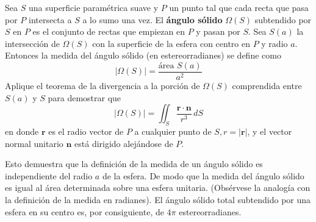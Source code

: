 \item Sea $S$ una superficie paramétrica suave y $P$ un punto tal que cada recta que pasa por $P$ intersecta a $S$ a lo sumo una vez. El \textbf{ángulo sólido} $\Omega(S)$ subtendido por $S$ en $P$ es el conjunto de rectas que empiezan en $P$ y pasan por $S$. Sea $S(a)$ la intersección de $\Omega(S)$ con la superficie de la esfera con centro en $P$ y radio $a$. Entonces la medida del ángulo sólido (en estereorradianes) se define como
    \[ |\Omega(S)| = \frac{\text{área } S(a)}{a^2} \]
    Aplique el teorema de la divergencia a la porción de $\Omega(S)$ comprendida entre $S(a)$ y $S$ para demostrar que
    \[ |\Omega(S)| = \iint_S \frac{\mathbf{r} \cdot \mathbf{n}}{r^3} \, dS \]
    en donde $\mathbf{r}$ es el radio vector de $P$ a cualquier punto de $S, r = |\mathbf{r}|$, y el vector normal unitario $\mathbf{n}$ está dirigido alejándose de $P$.
    
    Esto demuestra que la definición de la medida de un ángulo sólido es independiente del radio $a$ de la esfera. De modo que la medida del ángulo sólido es igual al área determinada sobre una esfera unitaria. (Obsérvese la analogía con la definición de la medida en radianes). El ángulo sólido total subtendido por una esfera en su centro es, por consiguiente, de $4\pi$ estereorradianes.

